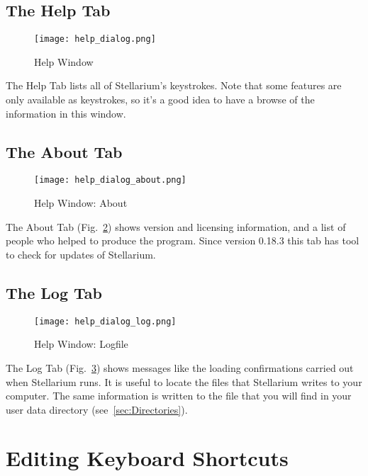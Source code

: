 \subsection{The Help Tab}
\label{sec:gui:help:help}
\begin{figure}[htp]
\centering\texttt{[image: help\_dialog.png]}
\caption{Help Window}
\label{fig:gui:help}
\end{figure}

\noindent The Help Tab lists all of Stellarium's keystrokes. Note that some
features are only available as keystrokes, so it's a good idea to have
a browse of the information in this window.

\subsection{The About Tab}
\label{sec:gui:help:about}
\begin{figure}[tbp]
\centering\texttt{[image: help\_dialog\_about.png]}
\caption{Help Window: About}
\label{fig:gui:help:about}
\end{figure}

The About Tab (Fig.~\ref{fig:gui:help:about}) shows version and licensing information, and a list of people who helped to produce the program.
Since version 0.18.3  this tab has tool to check for updates of Stellarium.

\subsection{The Log Tab}
\label{sec:gui:help:log}
\begin{figure}[tbp]
\centering\texttt{[image: help\_dialog\_log.png]}
\caption{Help Window: Logfile}
\label{fig:gui:help:log}
\end{figure}

The Log Tab (Fig.~\ref{fig:gui:help:log}) shows messages like the loading confirmations carried out when
Stellarium runs. It is useful to locate the files that Stellarium writes
to your computer. The same information is written to  the file  that you will
find in your user data directory (see~\ref{sec:Directories}).


\section{Editing Keyboard Shortcuts}
\label{sec:gui:help:hotkeys}

